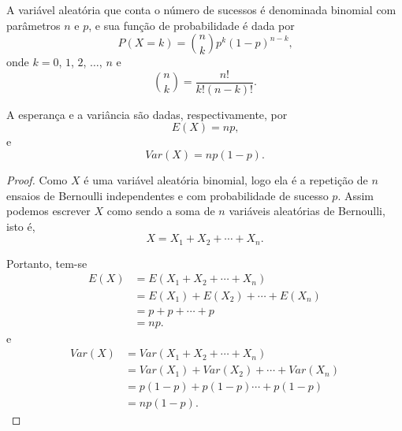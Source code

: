 A variável aleatória que conta o número de sucessos é denominada binomial com parâmetros $n$ e $p$, e sua função de probabilidade é dada por
\begin{equation}
	P(X=k)= {n\choose k} p^k (1-p)^{n-k}\text{,}
\end{equation}
onde $k=0$, $1$, $2$, $\dots$, $n$ e
\[
	{n\choose k} = \frac{n!}{k!(n-k)!}\text{.}
\]

A esperança e a variância são dadas, respectivamente, por
\begin{equation}
	E(X)=np\text{,}
\end{equation}
e
\begin{equation}
	Var(X)=np(1-p)\text{.}
\end{equation}

\begin{proof}
	Como $X$ é uma variável aleatória binomial, logo ela é a repetição de $n$ ensaios de Bernoulli independentes e com probabilidade de sucesso $p$. Assim podemos escrever $X$ como sendo a soma de $n$ variáveis aleatórias de Bernoulli, isto é,
	\[
		X=X_1 + X_2 + \cdots + X_n\text{.}
	\]

	Portanto, tem-se
	\begin{align*}
		E(X) &= E(X_1 + X_2 + \cdots + X_n)\\
			&= E(X_1) + E(X_2) + \cdots + E(X_n)\\
			&= p + p + \cdots + p\\
			&= np\text{.}
	\end{align*}
	e
	\begin{align*}
		Var(X)&=Var(X_1 + X_2 + \cdots + X_n)\\
			&= Var(X_1) + Var(X_2) + \cdots + Var(X_n)\\
			&= p(1-p) + p(1-p) \cdots + p(1-p)\\
			&= np(1-p)\text{.}
	\end{align*}
\end{proof}

\newpage

